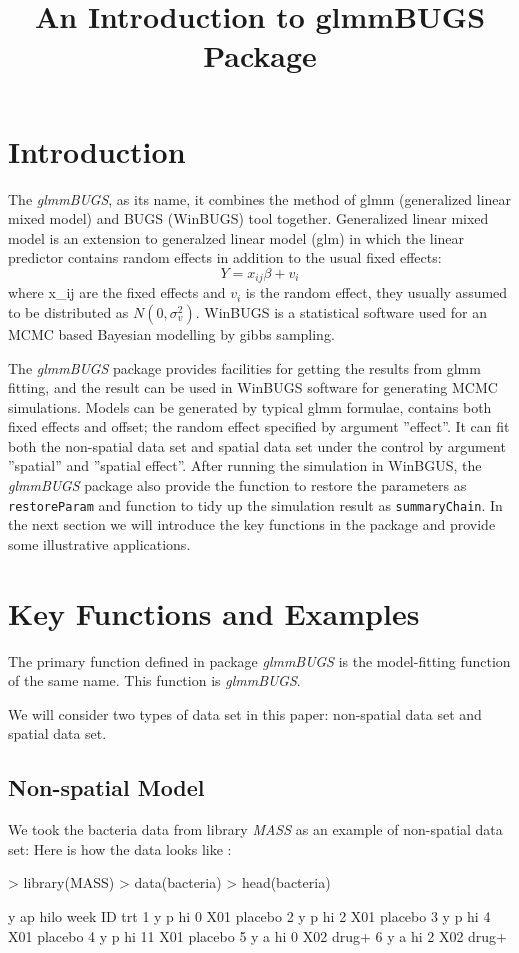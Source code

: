 \documentclass{article}
\title{An Introduction to glmmBUGS Package}
\begin{document}
\maketitle

\large
\section{Introduction}
The \textit{glmmBUGS}, as its name, it combines the method of glmm (generalized linear mixed model) and BUGS (WinBUGS) tool together. 
Generalized linear mixed model is an extension to generalzed linear model (glm) in which the linear predictor contains random effects 
in addition to the usual fixed effects: 
\[Y = x_{ij}\beta + v_i\]
where x_{ij} are the fixed effects and $v_i$ is the random effect, they usually assumed to be distributed as $N(0, \sigma_v^2)$. 
WinBUGS is a statistical software used for an MCMC based Bayesian modelling by gibbs sampling.  

The \textit{glmmBUGS} package provides facilities for getting the results from glmm fitting, and the result can be used in WinBUGS software for generating MCMC simulations. Models can be generated by typical glmm formulae, contains both fixed effects and offset; the random effect specified by argument ''effect''. It can fit both the non-spatial data set and spatial data set under the control by argument ''spatial'' and ''spatial effect''. After running the simulation in WinBGUS, the \textit{glmmBUGS} package also provide the function to restore the parameters as \verb!restoreParam! and function to tidy up the simulation result as \verb!summaryChain!.  In the next section we will introduce the key functions in the package and provide some illustrative applications.   

\section{Key Functions and Examples}
The primary function defined in package \textit{glmmBUGS} is the model-fitting function of the same name.
This function is \textit{glmmBUGS}. 

We will consider two types of data set in this paper: non-spatial data set and spatial data set.

\subsection{Non-spatial Model} 
We took the bacteria data from library \textit{MASS} as an example of non-spatial data set: 
Here is how the data looks like : 
\begin{Schunk}
\begin{Sinput}
> library(MASS)
> data(bacteria)
> head(bacteria)
\end{Sinput}
\begin{Soutput}
  y ap hilo week  ID     trt
1 y  p   hi    0 X01 placebo
2 y  p   hi    2 X01 placebo
3 y  p   hi    4 X01 placebo
4 y  p   hi   11 X01 placebo
5 y  a   hi    0 X02   drug+
6 y  a   hi    2 X02   drug+
\end{Soutput}
\end{Schunk}
\end{document}
